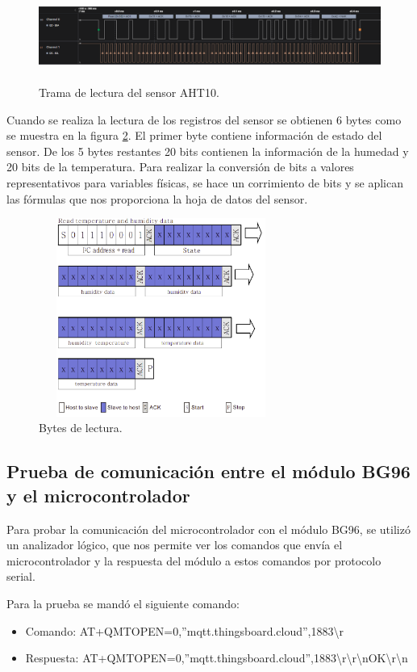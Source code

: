 \begin{figure}[h!]
  \centering
    \includegraphics[width=\linewidth, height=3cm]{./Figures/read_i2c..png}
  \caption{Trama de lectura del sensor AHT10.}
    \label{fig:read aht10}
\end{figure}
Cuando se realiza la lectura de los registros del sensor se obtienen 6 bytes como se muestra en la figura \ref{fig:Bytes de lectura}. El primer byte contiene información de estado del sensor. De los 5 bytes restantes 20 bits contienen la información de la humedad y 20 bits de la temperatura. Para realizar la conversión de bits a valores representativos para variables físicas, se hace un corrimiento de bits y se aplican las fórmulas que nos proporciona la hoja de datos del sensor. 
\begin{figure}[h!]
  \centering
    \includegraphics[width=8cm, height=6.5cm]{./Figures/info_bytes.png}
  \caption{Bytes de lectura.}
    \label{fig:Bytes de lectura}
\end{figure}

\subsection{Prueba de comunicación entre el módulo BG96 y el microcontrolador}

Para probar la comunicación del microcontrolador con el módulo BG96, se utilizó un analizador lógico, que nos permite ver los comandos que envía el microcontrolador y la respuesta del módulo a estos comandos por protocolo serial.

Para la prueba se mandó el siguiente comando:
\begin{itemize}
  \item Comando: AT+QMTOPEN=0,”mqtt.thingsboard.cloud”,1883\textbackslash r 
  \item Respuesta: AT+QMTOPEN=0,”mqtt.thingsboard.cloud”,1883\textbackslash r\textbackslash r\textbackslash nOK\textbackslash r\textbackslash n
\end{itemize}

